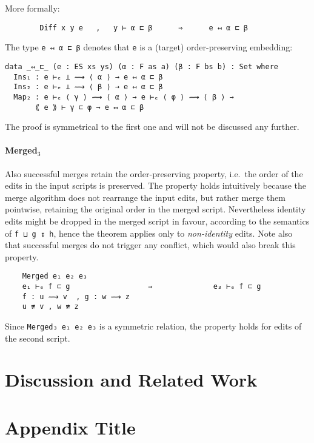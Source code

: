 \documentclass[preprint]{sigplanconf}
\begin{document}
    More formally:
\begin{verbatim}
        Diff x y e   ,   y ⊢ α ⊏ β      ⇒      e ↤ α ⊏ β
\end{verbatim}

    The type \texttt{e ↤ α ⊏ β} denotes that \texttt{e} is a (target) 
    order-preserving embedding:

\begin{verbatim}
data _↤_⊏_ (e : ES xs ys) (α : F as a) (β : F bs b) : Set where
  Ins₁ : e ⊢ₑ ⊥ ⟿ ⟨ α ⟩ → e ↤ α ⊏ β
  Ins₂ : e ⊢ₑ ⊥ ⟿ ⟨ β ⟩ → e ↤ α ⊏ β
  Map₂ : e ⊢ₑ ⟨ γ ⟩ ⟿ ⟨ α ⟩ → e ⊢ₑ ⟨ φ ⟩ ⟿ ⟨ β ⟩ → 
       ⟪ e ⟫ ⊢ γ ⊏ φ → e ↤ α ⊏ β
\end{verbatim}

    The proof is symmetrical to the first one and will not be discussed any further.

    \paragraph{Merged$_3$}
    Also successful merges retain the order-preserving property, i.e.\
    the order of the edits in the input scripts is preserved.
    The property holds intuitively because the merge algorithm
    does not rearrange the input edits, 
    but rather merge them pointwise, retaining the original order in the merged 
    script.
    Nevertheless identity edits might be dropped in the merged script in favour,
    according to the semantics of \texttt{f ⊔ g ↧ h}, hence
    the theorem applies only to \emph{non-identity} edits.
    Note also that successful merges do not trigger any conflict, which
    would also break this property.

\begin{verbatim}
    Merged e₁ e₂ e₃
    e₁ ⊢ₑ f ⊏ g                  ⇒              e₃ ⊢ₑ f ⊏ g
    f : u ⟿ v  , g : w ⟿ z  
    u ≢ v , w ≢ z
\end{verbatim}
    Since \texttt{Merged₃ e₁ e₂ e₃} is a symmetric relation, the property holds 
    for edits of the second script. 

\section{Discussion and Related Work}
\label{sec:related-work}

\appendix
\section{Appendix Title}
\end{document}
